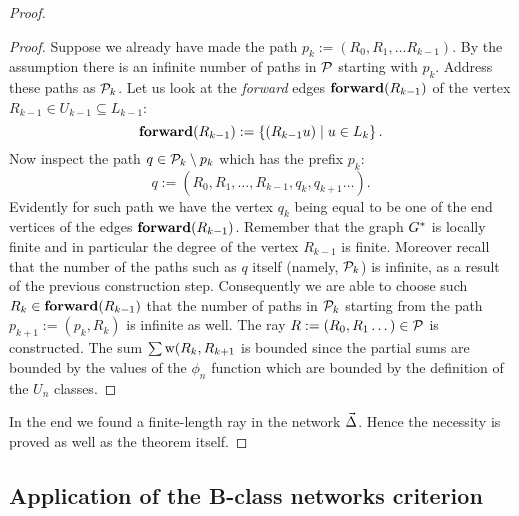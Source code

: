 \documentclass[12pt]{article}
\begin{document}
\begin{proof}
\begin{proof}
        Suppose we already have made the path $p_k:= (R_0, R_1,\dots R_{k-1})$. 
        By the assumption there is an infinite number of paths in $\cal{P}$ starting with $p_k$.
        Address these paths as $\cal{P}_k$.
        Let us look at the \emph{forward} edges $\efor(R_{k-1})$ of the vertex $R_{k-1} \in U_{k-1} \subseteq L_{k-1}$:
        \[
          \efor(R_{k-1}):=\left\{(R_{k-1} u) \mid u \in L_k\right\}.
        \]
        Now inspect the path $q \in \cal{P}_k \setminus p_k$ which has the prefix $p_k$:
        \[
          q:=(R_0,R_1,\dots,R_{k-1},q_k,q_{k+1} \dots).
        \]
        Evidently for such path we have the vertex $q_k$ being equal to be one of the end vertices of the edges $\efor(R_{k-1})$.
        Remember that the graph $\gstar$ is locally finite and in particular the degree of the vertex $R_{k-1}$ is finite.
        Moreover recall that the number of the paths such as $q$ itself (namely, $\cal{P}_k$) is infinite,
          as a result of the previous construction step.
        Consequently we are able to choose such $R_k \in \efor(R_{k-1})$ that the number of paths in $\cal{P}_k$ starting from
          the path $p_{k+1}:= (p_k, R_k)$ is infinite as well.
        The ray $R := (R_0, R_1 \dots) \in \cal{P}$ is constructed.
        The sum $\sum \wtp(R_k, R_{k+1}$ is bounded since the partial sums are bounded by the values of the $\phi_n$ function which are bounded
          by the definition of the $U_n$ classes.
      \end{proof}
      In the end we found a finite-length ray in the network $\onet$.
      Hence the necessity is proved as well as the theorem itself.
    \end{proof}
  \subsection{Application of the B-class networks criterion}
\end{document}
